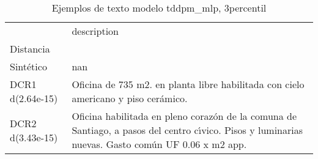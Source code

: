 \begin{table}[H]
\centering
\fontsize{10}{14}\selectfont
\caption{Ejemplos de texto modelo tddpm\_mlp, 3percentil}
\label{table-example-economicos-b-2-tddpm_mlp-3p-text}
\begin{tabular}{|l|m{35em}|}
\hline
\rowcolor[gray]{0.8}
 & description \\
Distancia &  \\
\hline Sintético & nan \\
\hline DCR1 d(2.64e-15) & Oficina de 735 m2.  en planta libre habilitada con cielo americano y piso cer\'amico. \\
\hline DCR2 d(3.43e-15) & Oficina habilitada en pleno coraz\'on de la comuna de Santiago, a pasos del centro c{\'\i}vico.  Pisos y luminarias nuevas.  Gasto com\'un UF 0.06 x m2 app. \\
\hline
\end{tabular}
\end{table}
